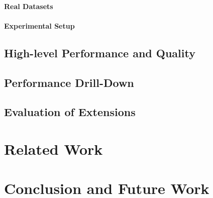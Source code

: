 \documentclass{vldb}
\begin{document}
\paragraph*{Real Datasets}

\paragraph*{Experimental Setup}

\subsection{High-level Performance and Quality}

\subsection{Performance Drill-Down}

\subsection{Evaluation of Extensions}



\section{Related Work}



\section{Conclusion and Future Work}



{
\scriptsize


}
\end{document}
